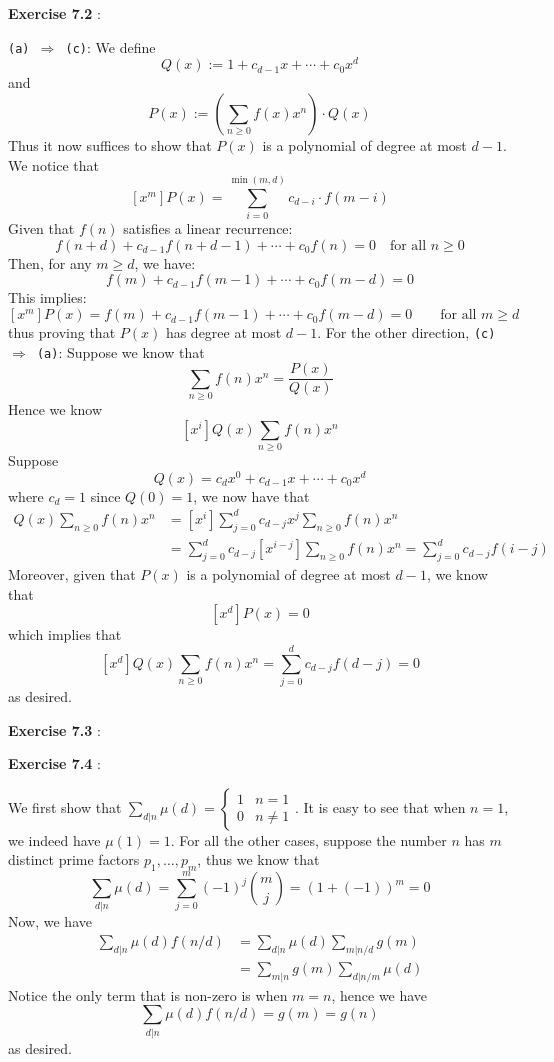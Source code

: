 \documentclass{article}
\newenvironment{solution}[1][\proofname]{
    \proof[\textbf{Solution:}] \renewcommand{\qedsymbol}{$\bell$}
}{\endproof}
\begin{document}
\newpage

\noindent \textbf{Exercise 7.2} : 

\begin{solution}
    \texttt{(a) $\Rightarrow$ (c)}: We define 
    \[ Q(x) := 1 + c_{d-1} x + \cdots + c_0 x^d \]
    and 
    \[ P(x) := \left( \sum_{n \geq 0} f(x) x^n \right) \cdot Q(x) \]
    Thus it now suffices to show that $P(x)$ is a polynomial of degree at most $d - 1$. We notice that 
    \[ [x^m] P(x) = \sum_{i = 0}^{\min(m, d)} c_{d - i} \cdot f(m - i) \]
    Given that $f(n)$ satisfies a linear recurrence:
    \[
    f(n + d) + c_{d-1} f(n + d - 1) + \cdots + c_0 f(n) = 0 \quad \text{for all } n \geq 0
    \]
    Then, for any $m \geq d$, we have:
    \[ f(m) + c_{d-1} f(m - 1) + \cdots + c_0 f(m - d) = 0 \]
    This implies:
    \[ [x^m] P(x) = f(m) + c_{d-1} f(m - 1) + \cdots + c_0 f(m - d) = 0 \qquad \text{for all } m \geq d \] 
    thus proving that $P(x)$ has degree at most $d - 1$. For the other direction, \texttt{(c) $\Rightarrow$ (a)}: Suppose we know that 
    \[ \sum_{n \geq 0} f(n) x^n = \frac{P(x)}{Q(x)} \] 
    Hence we know 
    \[ [x^i] Q(x) \sum_{n \geq 0} f(n) x^n \] 
    Suppose 
    \[ Q(x) = c_d x^0 + c_{d-1} x + \cdots + c_0 x^d \]
    where $c_d = 1$ since $Q(0) = 1$, we now have that 
    \begin{align*}
        [x^i] Q(x) \sum_{n \geq 0} f(n) x^n
        & = [x^i] \sum_{j = 0}^d c_{d-j} x^j \sum_{n \geq 0} f(n) x^n \\ 
        & = \sum_{j = 0}^d c_{d-j} [x^{i-j}] \sum_{n \geq 0} f(n) x^n = \sum_{j = 0}^d c_{d-j} f(i-j)
    \end{align*}
    Moreover, given that $P(x)$ is a polynomial of degree at most $d-1$, we know that 
    \[ [x^d] P(x) = 0 \]
    which implies that 
    \[ [x^d] Q(x) \sum_{n \geq 0} f(n) x^n = \sum_{j = 0}^d c_{d-j} f(d-j) = 0 \]
    as desired. 
\end{solution}

\newpage

\noindent \textbf{Exercise 7.3} : 

\newpage

\noindent \textbf{Exercise 7.4} : 

\begin{solution}
    We first show that $\displaystyle \sum_{d|n} \mu(d) = \begin{cases}
        1 & n = 1 \\ 0 & n \neq 1
    \end{cases}$. It is easy to see that when $n = 1$, we indeed have $\mu(1) = 1$. For all the other cases, suppose the number $n$ has $m$ distinct prime factors $p_1, \ldots, p_m$, thus we know that 
    \[ \sum_{d|n} \mu(d) = \sum_{j = 0}^m (-1)^j \binom{m}{j} = (1 + (-1))^m = 0 \]
    Now, we have \begin{align*}
        \sum_{d|n} \mu(d) f(n/d) 
        & = \sum_{d|n} \mu(d) \sum_{m| n/d} g(m) \\ 
        & = \sum_{m|n} g(m) \sum_{d| n/m} \mu(d)
    \end{align*}
    Notice the only term that is non-zero is when $m = n$, hence we have 
    \[ \sum_{d|n} \mu(d) f(n/d) = g(m) = g(n) \]
    as desired. 
\end{solution}
\end{document}
